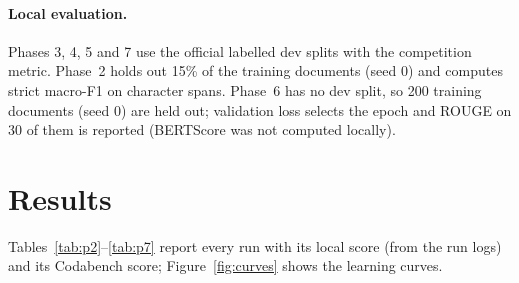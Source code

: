 \documentclass[11pt]{article}
\begin{document}
\paragraph{Local evaluation.} Phases 3, 4, 5 and 7 use the official labelled dev splits with the competition metric. Phase~2 holds out 15\% of the training documents (seed 0) and computes strict macro-F1 on character spans. Phase~6 has no dev split, so 200 training documents (seed 0) are held out; validation loss selects the epoch and ROUGE on 30 of them is reported (BERTScore was not computed locally).

\section{Results}
\label{sec:results}
Tables~\ref{tab:p2}--\ref{tab:p7} report every run with its local score (from the run logs) and its Codabench score; Figure~\ref{fig:curves} shows the learning curves.



\begin{table}[H]
\centering\small
\caption{Phase 7 (PCR) runs: Codabench Micro-F1@7 on the 237 test queries.}
\label{tab:p7}
\end{table}
\end{document}
